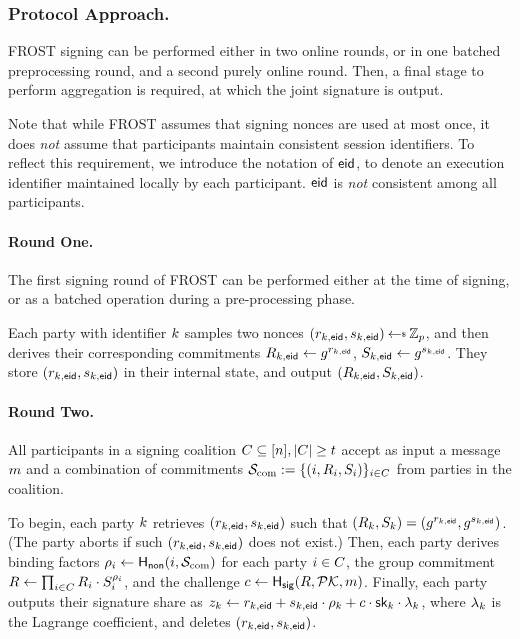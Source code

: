 \subsubsection{Protocol Approach.}

FROST signing can be performed either in two online rounds,
or in one batched preprocessing round,
and a second purely online round.
Then, a final stage to perform aggregation is required,
at which the joint signature is output.

Note that while FROST assumes that signing nonces are used at most once,
it does \emph{not} assume that participants maintain consistent session identifiers.
To reflect this requirement,
we introduce the notation of $\mathsf{eid}$, to denote an execution identifier maintained locally by each participant.
$\mathsf{eid}$ is \emph{not} consistent among all participants.

\paragraph{Round One.}
The first signing round of FROST can be performed either at the time of signing,
or as a batched operation during a pre-processing phase.

Each party with identifier $k$ samples two nonces $(r_{\partyid,\eid},  s_{\partyid, \eid}) \randpick \Zp$,
and then derives their corresponding commitments  $R_{k,\mathsf{eid}} \gets g^{r_{k, \mathsf{eid}}}$, $ S_{k,\mathsf{eid}} \gets  g^{s_{k,\mathsf{eid}}}$.
They store $(r_{k,\mathsf{eid}}, s_{k,\mathsf{eid}})$ in their internal state,
and output $(R_{k,\mathsf{eid}}, S_{k,\mathsf{eid}})$.

\paragraph{Round Two.}
All participants in a signing coalition $C \subseteq [n], \lvert C \rvert \geq t$ accept as input a message $m$ and a combination of commitments $\mathcal{S}_{\rm com} := \{ (i, R_{i}, S_{i})\}_{i \in C}$ from parties in the coalition.

To begin,
each party $k$ retrieves $(r_{k,\mathsf{eid}}, s_{k,\mathsf{eid}})$ such that $(R_k, S_k) = (g^{r_{k, \mathsf{eid}}}, g^{s_{k, \mathsf{eid}}})$. (The party aborts if such $(r_{k,\mathsf{eid}}, s_{k,\mathsf{eid}})$ does not exist.)
Then, each party derives binding factors $\rho_i \gets \mathsf{H_{non}}(i, \mathcal{S}_{\rm com})$ for each party $i \in C$, the group commitment $R \gets \prod_{i \in C} R_{i} \cdot  S_{i}^{\rho_i}$, and the challenge $c \gets \mathsf{H_{sig}}(R, \mathcal{PK}, m)$.
Finally, each party outputs their signature share as
$z_k \gets r_{k,\mathsf{eid}} + s_{k,\mathsf{eid}} \cdot \rho_k + c \cdot \mathsf{sk}_k \cdot \lambda_k$,
where $\lambda_k$ is the Lagrange coefficient,
and deletes $(r_{k,\mathsf{eid}}, s_{k,\mathsf{eid}})$.



